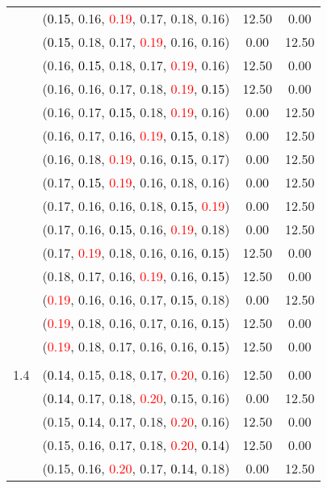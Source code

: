 \documentclass[10pt,a4paper]{report}
\begin{document}
\begin{center}
\begin{longtable}{clcc}
			&(\textcolor{black}{0.15}, 0.16, \textcolor{red}{0.19}, 0.17, 0.18, 0.16)&12.50&0.00\\
			&(\textcolor{black}{0.15}, 0.18, 0.17, \textcolor{red}{0.19}, 0.16, 0.16)&0.00&12.50\\
			&(0.16, \textcolor{black}{0.15}, 0.18, 0.17, \textcolor{red}{0.19}, 0.16)&12.50&0.00\\
			&(0.16, 0.16, 0.17, 0.18, \textcolor{red}{0.19}, \textcolor{black}{0.15})&12.50&0.00\\
			&(0.16, 0.17, \textcolor{black}{0.15}, 0.18, \textcolor{red}{0.19}, 0.16)&0.00&12.50\\
			&(0.16, 0.17, 0.16, \textcolor{red}{0.19}, \textcolor{black}{0.15}, 0.18)&0.00&12.50\\
			&(0.16, 0.18, \textcolor{red}{0.19}, 0.16, \textcolor{black}{0.15}, 0.17)&0.00&12.50\\
			&(0.17, \textcolor{black}{0.15}, \textcolor{red}{0.19}, 0.16, 0.18, 0.16)&0.00&12.50\\
			&(0.17, 0.16, 0.16, 0.18, \textcolor{black}{0.15}, \textcolor{red}{0.19})&0.00&12.50\\
			&(0.17, 0.16, \textcolor{black}{0.15}, 0.16, \textcolor{red}{0.19}, 0.18)&0.00&12.50\\
			&(0.17, \textcolor{red}{0.19}, 0.18, 0.16, 0.16, \textcolor{black}{0.15})&12.50&0.00\\
			&(0.18, 0.17, 0.16, \textcolor{red}{0.19}, 0.16, \textcolor{black}{0.15})&12.50&0.00\\
			&(\textcolor{red}{0.19}, 0.16, 0.16, 0.17, \textcolor{black}{0.15}, 0.18)&0.00&12.50\\
			&(\textcolor{red}{0.19}, 0.18, 0.16, 0.17, 0.16, \textcolor{black}{0.15})&12.50&0.00\\
			&(\textcolor{red}{0.19}, 0.18, 0.17, 0.16, 0.16, \textcolor{black}{0.15})&12.50&0.00\\
		&&&\\
		1.4			&(\textcolor{black}{0.14}, 0.15, 0.18, 0.17, \textcolor{red}{0.20}, 0.16)&12.50&0.00\\
			&(\textcolor{black}{0.14}, 0.17, 0.18, \textcolor{red}{0.20}, 0.15, 0.16)&0.00&12.50\\
			&(0.15, \textcolor{black}{0.14}, 0.17, 0.18, \textcolor{red}{0.20}, 0.16)&12.50&0.00\\
			&(0.15, 0.16, 0.17, 0.18, \textcolor{red}{0.20}, \textcolor{black}{0.14})&12.50&0.00\\
			&(0.15, 0.16, \textcolor{red}{0.20}, 0.17, \textcolor{black}{0.14}, 0.18)&0.00&12.50\\

\end{longtable}
\end{center}
\end{document}
